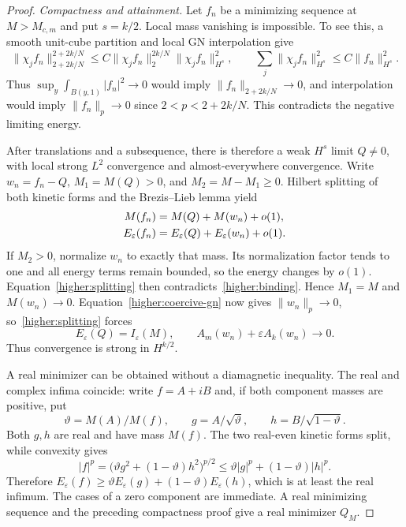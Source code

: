 \begin{proof}
\emph{Compactness and attainment.}
Let $f_n$ be a minimizing sequence at $M>M_{c,m}$ and put $s=k/2$.
Local mass vanishing is impossible. To see this, a smooth unit-cube
partition and local GN interpolation give
\[
 \|\chi_j f_n\|_{2+2k/N}^{2+2k/N}
    \le C\|\chi_j f_n\|_2^{2k/N}\|\chi_j f_n\|_{H^s}^2,
 \qquad
 \sum_j\|\chi_j f_n\|_{H^s}^2\le C\|f_n\|_{H^s}^2.
\]
Thus $\sup_y\int_{B(y,1)}|f_n|^2\to0$ would imply
$\|f_n\|_{2+2k/N}\to0$, and interpolation would imply
$\|f_n\|_p\to0$ since $2<p<2+2k/N$. This contradicts the negative
limiting energy.

After translations and a subsequence, there is therefore a weak
$H^s$ limit $Q\ne0$, with local strong $L^2$ convergence and
almost-everywhere convergence. Write $w_n=f_n-Q$,
$M_1=M(Q)>0$, and $M_2=M-M_1\ge0$. Hilbert splitting of both
kinetic forms and the Brezis--Lieb lemma yield
\begin{align}
 M(f_n)&=M(Q)+M(w_n)+o(1),\notag\\
 E_\varepsilon(f_n)&=E_\varepsilon(Q)
                         +E_\varepsilon(w_n)+o(1).
 \label{higher:splitting}
\end{align}
If $M_2>0$, normalize $w_n$ to exactly that mass. Its normalization
factor tends to one and all energy terms remain bounded, so the
energy changes by $o(1)$. Equation~\eqref{higher:splitting} then
contradicts~\eqref{higher:binding}. Hence $M_1=M$ and $M(w_n)\to0$.
Equation~\eqref{higher:coercive-gn} now gives $\|w_n\|_p\to0$,
so~\eqref{higher:splitting} forces
\[
 E_\varepsilon(Q)=I_\varepsilon(M),\qquad
 A_m(w_n)+\varepsilon A_k(w_n)\longrightarrow0.
\]
Thus convergence is strong in $H^{k/2}$.

A real minimizer can be obtained without a diamagnetic inequality.
The real and complex infima coincide: write $f=A+iB$ and, if both
component masses are positive, put
\[
 \vartheta=M(A)/M(f),\qquad
 g=A/\sqrt\vartheta,\qquad h=B/\sqrt{1-\vartheta}.
\]
Both $g,h$ are real and have mass $M(f)$. The two real-even kinetic
forms split, while convexity gives
\[
 |f|^p=\big(\vartheta g^2+(1-\vartheta)h^2\big)^{p/2}
             \le\vartheta|g|^p+(1-\vartheta)|h|^p.
\]
Therefore $E_\varepsilon(f)\ge
\vartheta E_\varepsilon(g)+(1-\vartheta)E_\varepsilon(h)$,
which is at least the real infimum. The cases of a zero component
are immediate. A real minimizing sequence and the preceding
compactness proof give a real minimizer $Q_M$.


\end{proof}
